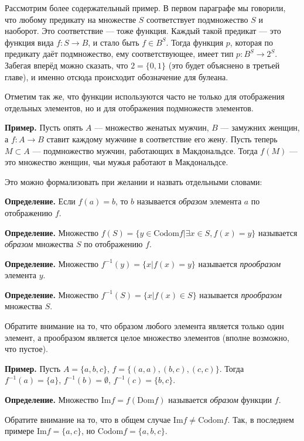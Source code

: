 Рассмотрим более содержательный пример. В первом параграфе мы говорили, что любому предикату на множестве $S$ соответствует подмножество $S$ и наоборот. Это соответствие — тоже функция. Каждый такой предикат — это функция вида $f:S\to B$, и стало быть $f\in B^S$. Тогда функция $p$, которая по предикату даёт подмножество, ему соответствующее, имеет тип $p:B^S \to 2^S$. Забегая вперёд можно сказать, что $2=\{0, 1\}$ (это будет объяснено в третьей главе), и именно отсюда происходит обозначение для булеана.

Отметим так же, что функции используются часто не только для отображения отдельных элементов, но и для отображения подмножеств элементов.

{\bfseries Пример.} Пусть опять $A$ — множество женатых мужчин, $B$ — замужних женщин, а $f: A\to B$ ставит каждому мужчине в соответствие его жену. Пусть теперь $M\subset A$ — подмножество мужчин, работающих в Макдональдсе. Тогда $f(M)$ — это множество женщин, чьи мужья работают в Макдональдсе.

Это можно формализовать при желании и назвать отдельными словами:

{\bfseries Определение.} Если $f(a) = b$, то $b$ называется {\slshape образом} элемента $a$ по отображению $f$.

{\bfseries Определение.} Множество $f(S) = \{y\in \mathrm{Codom}f|\exists x \in S, f(x) = y \}$ называется {\slshape образом} множества $S$ по отображению $f$.

{\bfseries Определение.} Множество $f^{-1}(y) = \{x | f(x) = y \}$ называется {\slshape прообразом} элемента $y$.

{\bfseries Определение.} Множество $f^{-1}(S) = \{x | f(x) \in S \}$ называется {\slshape прообразом} множества $S$.

Обратите внимание на то, что образом любого элемента является только один элемент, а прообразом является целое множество элементов (вполне возможно, что пустое).

{\bfseries Пример.} Пусть $A = \{a, b, c\}$, $f = \{(a, a), (b, c), (c, c)\}$. Тогда $f^{-1}(a) = \{a\}$, $f^{-1}(b) = \emptyset$, $f^{-1}(c) = \{b, c\}$.

{\bfseries Определение.} Множество $\mathrm{Im} f = f(\mathrm{Dom} f)$ называется {\slshape образом} функции $f$.

Обратите внимание на то, что в общем случае $\mathrm{Im} f \not= \mathrm{Codom} f$. Так, в последнем примере $\mathrm{Im} f = \{a, c\}$, но $\mathrm{Codom}f = \{a, b, c\}$.

